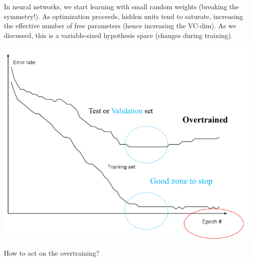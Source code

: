 \documentclass[10pt]{report}
\begin{document}
In neural networks, we start learning with small random weights (breaking the symmetry!). As optimization proceeds, hidden units tend to saturate, increasing the effective number of free parameters (hence increasing the VC-dim). As we discussed, this is a variable-sized hypothesis space (changes during training).
\begin{center}
	\includegraphics[scale=0.5]{8.png}
\end{center}
How to act on the overtraining?
\end{document}
